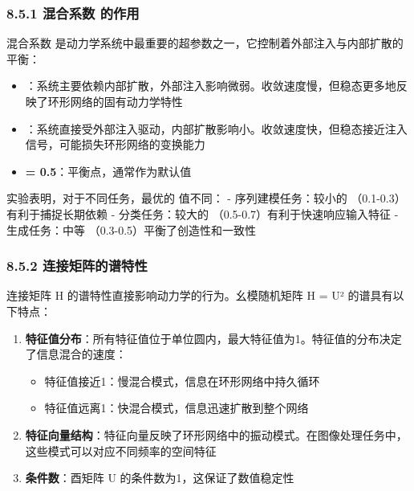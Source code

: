 \documentclass[
  12pt,
]{article}
\providecommand{\tightlist}{%
  \setlength{\itemsep}{0pt}\setlength{\parskip}{0pt}}
\begin{document}
\hypertarget{ux6df7ux5408ux7cfbux6570-ux3b1-ux7684ux4f5cux7528}{%
\subsubsection{8.5.1 混合系数 \alpha
的作用}\label{ux6df7ux5408ux7cfbux6570-ux3b1-ux7684ux4f5cux7528}}

混合系数 \alpha
是动力学系统中最重要的超参数之一，它控制着外部注入与内部扩散的平衡：

\begin{itemize}
\tightlist
\item
  \textbf{\alpha {}}：系统主要依赖内部扩散，外部注入影响微弱。收敛速度慢，但稳态更多地反映了环形网络的固有动力学特性
\item
  \textbf{\alpha {}}：系统直接受外部注入驱动，内部扩散影响小。收敛速度快，但稳态接近注入信号，可能损失环形网络的变换能力
\item
  \textbf{\alpha = 0.5}：平衡点，通常作为默认值
\end{itemize}

实验表明，对于不同任务，最优的 \alpha 值不同： - 序列建模任务：较小的
\alpha（0.1-0.3）有利于捕捉长期依赖 - 分类任务：较大的
\alpha（0.5-0.7）有利于快速响应输入特征 - 生成任务：中等
\alpha（0.3-0.5）平衡了创造性和一致性

\hypertarget{ux8fdeux63a5ux77e9ux9635ux7684ux8c31ux7279ux6027}{%
\subsubsection{8.5.2
连接矩阵的谱特性}\label{ux8fdeux63a5ux77e9ux9635ux7684ux8c31ux7279ux6027}}

连接矩阵 H 的谱特性直接影响动力学的行为。幺模随机矩阵 H =
\textbar U\textbar² 的谱具有以下特点：

\begin{enumerate}
\def\labelenumi{\arabic{enumi}.}
\item
  \textbf{特征值分布}：所有特征值位于单位圆内，最大特征值为1。特征值的分布决定了信息混合的速度：

  \begin{itemize}
  \tightlist
  \item
    特征值接近1：慢混合模式，信息在环形网络中持久循环
  \item
    特征值远离1：快混合模式，信息迅速扩散到整个网络
  \end{itemize}
\item
  \textbf{特征向量结构}：特征向量反映了环形网络中的振动模式。在图像处理任务中，这些模式可以对应不同频率的空间特征
\item
  \textbf{条件数}：酉矩阵 U 的条件数为1，这保证了数值稳定性
\end{enumerate}
\end{document}
